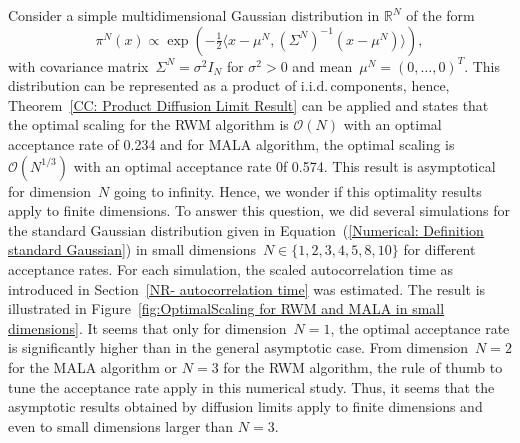 Consider a simple multidimensional Gaussian distribution in $\mathbb{R}^N$  of the form
\begin{equation}
 \label{Numerical: Definition standard Gaussian}
 \pi^N (x) \varpropto \exp \left( -\tfrac{1}{2} \langle x - \mu^N, (\Sigma^N)^{-1} (x-\mu^N) \rangle  \right),
\end{equation}
with covariance matrix~$\Sigma^N = \sigma^2 I_N$ for $\sigma^2 >0$ and mean~$\mu^N = (0, \dots, 0)^T$. This distribution can be represented as a product of i.i.d.\,components, hence, Theorem~\ref{CC: Product Diffusion Limit Result} can be applied and states that the optimal scaling for the RWM algorithm is $\mathcal{O}(N)$ with an optimal acceptance rate of 0.234 and for MALA algorithm, the optimal scaling is $\mathcal{O}(N^{1/3})$ with an optimal acceptance rate 0f 0.574. This result is asymptotical for dimension~$N$ going to infinity. Hence, we wonder if this optimality results apply to finite dimensions. To answer this question, we did several simulations for the standard Gaussian distribution given in Equation~(\ref{Numerical: Definition standard Gaussian}) in small dimensions~$N \in \{ 1,2,3,4,5,8,10 \}$ for different acceptance rates. For each simulation, the scaled autocorrelation time as introduced in Section~\ref{NR- autocorrelation time} was estimated. The result is illustrated in Figure~\ref{fig:OptimalScaling for RWM and MALA in small dimensions}. It seems that only for dimension~$N=1$, the optimal acceptance rate is significantly higher than in the general asymptotic case. From dimension~$N=2$ for the MALA algorithm or $N=3$ for the RWM algorithm, the rule of thumb to tune the acceptance rate apply in this numerical study. Thus, it seems that the asymptotic results obtained by diffusion limits apply to finite dimensions and even to small dimensions larger than $N=3$. 

